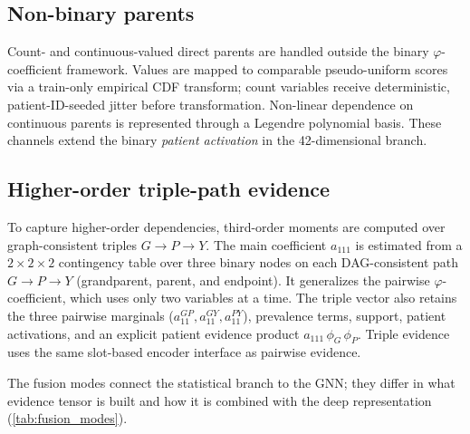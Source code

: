 \subsection{Non-binary parents}
Count- and continuous-valued direct parents are handled outside the binary
\(\varphi\)-coefficient framework. Values are mapped to comparable
pseudo-uniform scores via a train-only empirical CDF transform; count
variables receive deterministic, patient-ID-seeded jitter before
transformation. Non-linear dependence on continuous parents is represented
through a Legendre polynomial basis. These channels extend the binary \emph{patient activation}
in the 42-dimensional branch.

\subsection{Higher-order triple-path evidence}
To capture higher-order dependencies,
third-order moments are computed over graph-consistent
triples \(G \rightarrow P \rightarrow Y\).
The main coefficient \(a_{111}\) is estimated from a \(2 \times 2 \times 2\)
contingency table over three binary nodes on each DAG-consistent path
\(G \rightarrow P \rightarrow Y\) (grandparent, parent, and endpoint).
It generalizes the pairwise $\varphi$-coefficient, which uses only two
variables at a time.
The triple vector also retains the three pairwise marginals
(\(a_{11}^{GP}, a_{11}^{GY}, a_{11}^{PY}\)), prevalence terms, support,
patient activations, and an explicit patient evidence product
\(a_{111}\,\phi_G\,\phi_P\). 
Triple evidence uses the same slot-based encoder
interface as pairwise evidence.

The fusion modes connect the statistical branch to the GNN; they differ in
what evidence tensor is built and how it is combined with the deep
representation (\cref{tab:fusion_modes}).

